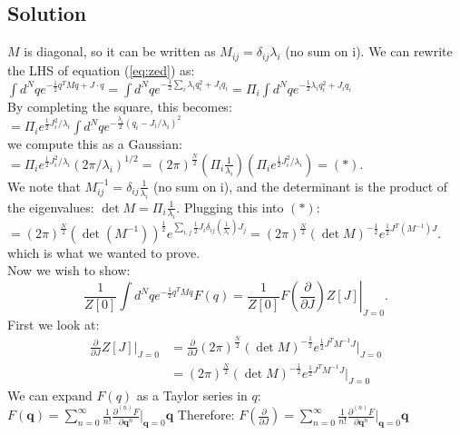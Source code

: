 \documentclass{article}
\begin{document}
\subsection*{Solution}
$M$ is diagonal, so it can be written as $M_{ij}=\delta_{ij}\lambda_i$ (no sum on i). We can rewrite the LHS of equation (\ref{eq:zed}) as:\\
$\int d^N q e^{-\frac{1}{2} q^T M q+J \cdot q}=\int d^N q e^{-\frac{1}{2} \sum_i \lambda_i q_i^2+J_iq_i}= \Pi_i \int d^N q e^{-\frac{1}{2} \lambda_i q_i^2+J_iq_i}$\\
By completing the square, this becomes:\\
$=\Pi_i e^{\frac{1}{2}J^2_i/\lambda_i}\int d^N q e^{-\frac{\lambda_i}{2}(q_i-J_i/\lambda_i)^2}$\\
we compute this as a Gaussian:\\
$=\Pi_i e^{\frac{1}{2}J^2_i/\lambda_i}(2\pi/\lambda_i)^{1/2}=(2\pi)^{\frac{N}{2}}(\Pi_i \frac{1}{\lambda_i})(\Pi_i e^{\frac{1}{2}J^2_i/\lambda_i})=(*)$. \\
We note that $M^{-1}_{ij}=\delta_{ij}\frac{1}{\lambda_i}$ (no sum on i), and the determinant is the product of the eigenvalues: $\det M =\Pi_i \frac{1}{\lambda_i}$. Plugging this into $(*)$:\\
$=(2\pi)^{\frac{N}{2}}(\det (M^{-1}))^{\frac{1}{2}}e^{\sum_{i,j} \frac{1}{2}J_i\delta_{ij}(\frac{1}{\lambda_i})J_j}=$$(2\pi)^{\frac{N}{2}}(\det M)^{-\frac{1}{2}}e^{ \frac{1}{2}J^T(M^{-1})J}$.\\
which is what we wanted to prove.\\
Now we wish to show:\\
\begin{equation}
\frac{1}{Z[0]} \int d^N q e^{-\frac{1}{2} q^T M q} F(q)=\left.\frac{1}{Z[0]} F\left(\frac{\partial}{\partial J}\right) Z[J]\right|_{J=0} .
\end{equation}
First we look at:
\begin{equation*}
\begin{split}
    \frac{\partial}{\partial J} Z[J]|_{J=0} 
    &=\frac{\partial}{\partial J} (2 \pi)^{\frac{N}{2}}(\operatorname{det} M)^{-\frac{1}{2}} e^{\frac{1}{2} J^T M^{-1} J} |_{J=0}\\
    &= (2 \pi)^{\frac{N}{2}}(\operatorname{det} M)^{-\frac{1}{2}} e^{\frac{1}{2} J^T M^{-1} J} |_{J=0}
    
\end{split}
\end{equation*}
We can expand $F(q)$ as a Taylor series in $q$:\\
$F(\mathbf{q})=\sum_{n=0}^{\infty} \frac{1}{n!}\frac{\partial^{(n)}F}{\partial \mathbf{q}^n}|_{\mathbf{q}=0}\mathbf{q}$
Therefore:
$F(\frac{\partial}{\partial J})=\sum_{n=0}^{\infty} \frac{1}{n!}\frac{\partial^{(n)}F}{\partial \mathbf{q}^n}|_{\mathbf{q}=0}\mathbf{q}$
\end{document}
